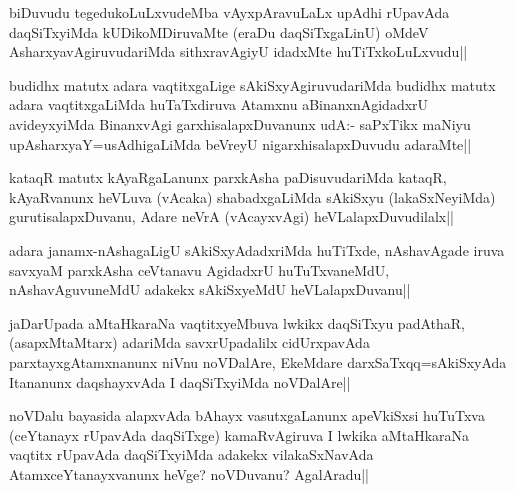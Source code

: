 
\begin{artha}
biDuvudu tegedukoLuLxvudeMba vAyxpAravuLaLx upAdhi rUpavAda daqSiTxyiMda kUDikoMDiruvaMte (eraDu daqSiTxgaLinU) oMdeV AsharxyavAgiruvudariMda sithxravAgiyU idadxMte huTiTxkoLuLxvudu||
\end{artha}


\begin{artha}
budidhx matutx adara vaqtitxgaLige sAkiSxyAgiruvudariMda budidhx matutx adara vaqtitxgaLiMda huTaTxdiruva Atamxnu aBinanxnAgidadxrU avideyxyiMda BinanxvAgi garxhisalapxDuvanunx udA:- saPxTikx maNiyu upAsharxyaY=usAdhigaLiMda beVreyU nigarxhisalapxDuvudu adaraMte||
\end{artha}%

\begin{artha}
kataqR matutx kAyaRgaLanunx parxkAsha paDisuvudariMda kataqR, kAyaRvanunx heVLuva (vAcaka) shabadxgaLiMda sAkiSxyu (lakaSxNeyiMda) gurutisalapxDuvanu, Adare neVrA (vAcayxvAgi) heVLalapxDuvudilalx||
\end{artha}

\begin{artha}
adara janamx-nAshagaLigU sAkiSxyAdadxriMda huTiTxde, nAshavAgade iruva savxyaM parxkAsha ceVtanavu AgidadxrU huTuTxvaneMdU, nAshavAguvuneMdU adakekx sAkiSxyeMdU heVLalapxDuvanu||
\end{artha}


\begin{artha}
jaDarUpada aMtaHkaraNa vaqtitxyeMbuva lwkikx daqSiTxyu padAthaR, (asapxMtaMtarx) adariMda savxrUpadalilx cidUrxpavAda parxtayxgAtamxnanunx niVnu noVDalAre, EkeMdare darxSaTxqq=sAkiSxyAda Itananunx daqshayxvAda I daqSiTxyiMda noVDalAre||
\end{artha}


\begin{artha}%
noVDalu bayasida alapxvAda bAhayx vasutxgaLanunx apeVkiSxsi huTuTxva (ceYtanayx rUpavAda daqSiTxge) kamaRvAgiruva I lwkika aMtaHkaraNa vaqtitx rUpavAda daqSiTxyiMda adakekx vilakaSxNavAda AtamxceYtanayxvanunx heVge? noVDuvanu? AgalAradu||
\end{artha}

